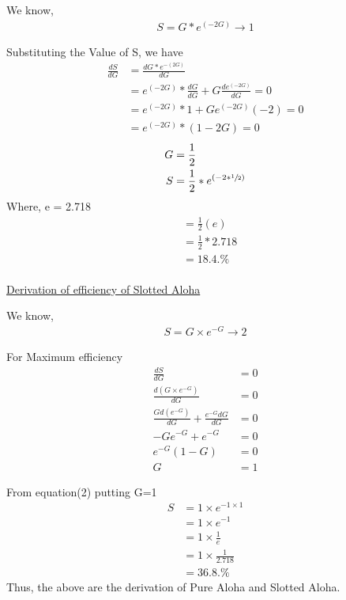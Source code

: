 \documentclass[13pt]{article}
\begin{document}
    \par \vspace{3mm}We know,
    \begin{align*}
    S = G*e^{(-2G)} \longrightarrow 1
    \end{align*}
    \par Substituting the Value of S, we have
\begin{align*}
    \frac{dS}{dG} &= \frac{dG*e^{-(2G)}}{dG}\\
    &= e^{(-2G)}*\frac{dG}{dG} + G\frac{de^{(-2G)}}{dG} = 0\\
    &= e^{(-2G)}*1 + Ge^{(-2G)}(-2) = 0\\
    &= e^{(-2G)}*(1-2G) = 0
    \end{align*}
    \begin{align*}
    G &= \frac{1}{2}\\
    S &= \frac{1}{2} * e^{(-2*\sfrac{1}{2})}
    \end{align*}
    Where, e = 2.718\\
    \begin{align*}
    &= \frac{1}{2}(e)\\
    &= \frac{1}{2} * 2.718\\
    &= 18.4.\% \\
\end{align*}
\newpage
\item \vspace{8mm} \underline{Derivation of efficiency of Slotted Aloha}\\
    \par \vspace{3mm} We know,
   \begin{align*}\label{eq1}
    S=G\times e^{-G} \longrightarrow 2
   \end{align*}
    \par For Maximum efficiency
\begin{align*}
      \frac{dS}{dG}&=0 \\
      \frac{d(G\times e^{-G})}{dG}&=0\\
      \frac{Gd(e^{-G})}{dG}+\frac{e^{-G}dG}{dG}&=0\\
      -Ge^{-G}+e^{-G}&=0\\
      e^{-G}(1-G)&=0\\
      G&=1
      \end{align*}
    \par From equation(2) putting G=1
    \begin{align*}
    S&=1\times e^{-1\times 1}\\
    &=1\times e^{-1}\\
    &=1\times \frac{1}{e}\\
    &=1\times \frac{1}{2.718}\\
    &=36.8.\%
    \end{align*}
Thus, the above are the derivation of Pure Aloha and Slotted Aloha.
\vspace{10mm}\hline
\end{document}
